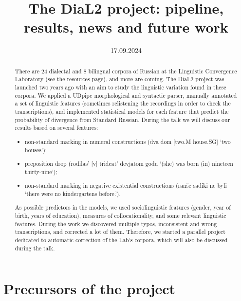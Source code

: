 \documentclass[
  ignorenonframetext,
  t]{beamer}
\title{The DiaL2 project: pipeline, results, news and future work}
\author{George Moroz \and Olga Gich \and Anna Grishanova \and Natalia
Koshelyuk \and Chiara Naccarato \and Anna Panova \and Anastasia
Yakovleva \and  \and Svetlana Zemicheva}
\date{17.09.2024}
\providecommand{\tightlist}{%
  \setlength{\itemsep}{0pt}\setlength{\parskip}{0pt}}\usepackage{longtable,booktabs,array}
\begin{document}
\frame{\titlepage}
\begin{abstract}
There are 24 dialectal and 8 bilingual corpora of Russian at the
Linguistic Convergence Laboratory (see the resources page), and more are
coming. The DiaL2 project was launched two years ago with an aim to
study the linguistic variation found in these corpora. We applied a
UDpipe morphological and syntactic parser, manually annotated a set of
linguistic features (sometimes relistening the recordings in order to
check the transcriptions), and implemented statistical models for each
feature that predict the probability of divergence from Standard
Russian. During the talk we will discuss our results based on several
features:

\begin{itemize}
\tightlist
\item
  non-standard marking in numeral constructions (dva dom {[}two.M
  house.SG{]} `two houses');
\item
  preposition drop (rodilas' {[}v{]} tridcat' devjatom godu `(she) was
  born (in) nineteen thirty-nine');
\item
  non-standard marking in negative existential constructions (ranše
  sadiki ne byli `there were no kindergartens before.').
\end{itemize}

As possible predictors in the models, we used sociolinguistic features
(gender, year of birth, years of education), measures of
collocationality, and some relevant linguistic features. During the work
we discovered multiple typos, inconsistent and wrong transcriptions, and
corrected a lot of them. Therefore, we started a parallel project
dedicated to automatic correction of the Lab's corpora, which will also
be discussed during the talk.
\end{abstract}


\section{Precursors of the project}\label{precursors-of-the-project}
\end{document}
